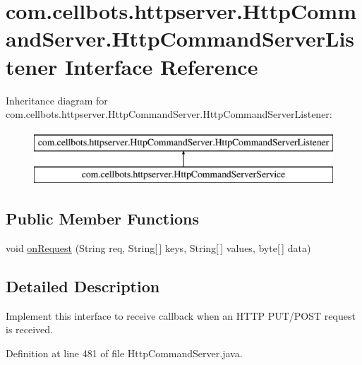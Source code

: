 \hypertarget{interfacecom_1_1cellbots_1_1httpserver_1_1_http_command_server_1_1_http_command_server_listener}{\section{com.\-cellbots.\-httpserver.\-Http\-Command\-Server.\-Http\-Command\-Server\-Listener Interface Reference}
\label{interfacecom_1_1cellbots_1_1httpserver_1_1_http_command_server_1_1_http_command_server_listener}
}
Inheritance diagram for com.\-cellbots.\-httpserver.\-Http\-Command\-Server.\-Http\-Command\-Server\-Listener\-:\begin{figure}[H]
\begin{center}
\leavevmode
\includegraphics[height=2.000000cm]{interfacecom_1_1cellbots_1_1httpserver_1_1_http_command_server_1_1_http_command_server_listener}
\end{center}
\end{figure}
\subsection*{Public Member Functions}
\begin{DoxyCompactItemize}
\item 
void \hyperlink{interfacecom_1_1cellbots_1_1httpserver_1_1_http_command_server_1_1_http_command_server_listener_a02b6e1dc1f2144f0a56b6a174bde5f0e}{on\-Request} (String req, String\mbox{[}$\,$\mbox{]} keys, String\mbox{[}$\,$\mbox{]} values, byte\mbox{[}$\,$\mbox{]} data)
\end{DoxyCompactItemize}


\subsection{Detailed Description}
Implement this interface to receive callback when an H\-T\-T\-P P\-U\-T/\-P\-O\-S\-T request is received. 

Definition at line 481 of file Http\-Command\-Server.\-java.



